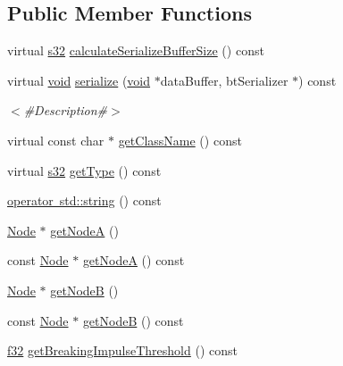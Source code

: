 \subsection*{Public Member Functions}
\begin{DoxyCompactItemize}
\item 
virtual \mbox{\hyperlink{_util_8h_aa62c75d314a0d1f37f79c4b73b2292e2}{s32}} \mbox{\hyperlink{classnjli_1_1_physics_constraint_aeda6c35ab271897cfe3192870d4ac7a4}{calculate\+Serialize\+Buffer\+Size}} () const
\item 
virtual \mbox{\hyperlink{_thread_8h_af1e856da2e658414cb2456cb6f7ebc66}{void}} \mbox{\hyperlink{classnjli_1_1_physics_constraint_ae294d089963246a8e65b41913730efb1}{serialize}} (\mbox{\hyperlink{_thread_8h_af1e856da2e658414cb2456cb6f7ebc66}{void}} $\ast$data\+Buffer, bt\+Serializer $\ast$) const
\begin{DoxyCompactList}\small\item\em $<$\#\+Description\#$>$ \end{DoxyCompactList}\item 
virtual const char $\ast$ \mbox{\hyperlink{classnjli_1_1_physics_constraint_a4d31c5267199972942d66b3480374010}{get\+Class\+Name}} () const
\item 
virtual \mbox{\hyperlink{_util_8h_aa62c75d314a0d1f37f79c4b73b2292e2}{s32}} \mbox{\hyperlink{classnjli_1_1_physics_constraint_a3234aefaf2706165fbc52b5b37c05888}{get\+Type}} () const
\item 
\mbox{\hyperlink{classnjli_1_1_physics_constraint_a4cb967ebae1b139bc7511bc9fcc074c5}{operator std\+::string}} () const
\item 
\mbox{\hyperlink{classnjli_1_1_node}{Node}} $\ast$ \mbox{\hyperlink{classnjli_1_1_physics_constraint_abe33286cebf5cb3c2e9440393f176517}{get\+NodeA}} ()
\item 
const \mbox{\hyperlink{classnjli_1_1_node}{Node}} $\ast$ \mbox{\hyperlink{classnjli_1_1_physics_constraint_ac3722d2349aedf66ea3378f1d8e41e2e}{get\+NodeA}} () const
\item 
\mbox{\hyperlink{classnjli_1_1_node}{Node}} $\ast$ \mbox{\hyperlink{classnjli_1_1_physics_constraint_adecbad6334d7fbfdafc8bc5bab75d171}{get\+NodeB}} ()
\item 
const \mbox{\hyperlink{classnjli_1_1_node}{Node}} $\ast$ \mbox{\hyperlink{classnjli_1_1_physics_constraint_aebd01f59387c919d255c07f1b1c0e0a2}{get\+NodeB}} () const
\item 
\mbox{\hyperlink{_util_8h_a5f6906312a689f27d70e9d086649d3fd}{f32}} \mbox{\hyperlink{classnjli_1_1_physics_constraint_aaffa0c7d84f053e276d0fda61db14550}{get\+Breaking\+Impulse\+Threshold}} () const

\end{DoxyCompactItemize}
